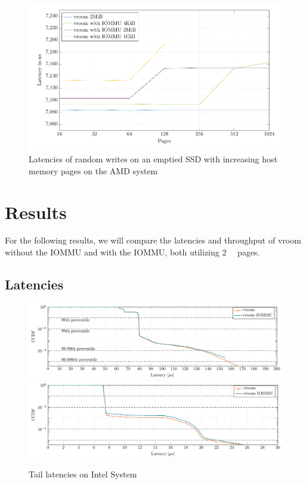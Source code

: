\begin{figure}[H]
  \centering
  \includegraphics[width=\textwidth]{figures/psmedsepyc}
  \caption{Latencies of random writes on an emptied SSD with increasing host memory pages on the AMD system}
  \label{fig:med-psepyc}
\end{figure}

\section{Results}
For the following results, we will compare the latencies and throughput of vroom without the IOMMU and with the IOMMU, both utilizing \qty{2}{\mebi\byte} pages.

\subsection{Latencies}
\begin{figure}[H]
  \centering
   {\includegraphics[width=.99\textwidth]{figures/lats_ccdf_2MiB_qd1t1_read} \label{fig:ccdf-read}}
   {\includegraphics[width=.99\textwidth]{figures/lats_ccdf_2MiB_qd1t1} \label{fig:ccdf-write}}
  \caption{Tail latencies on Intel System}
  \label{fig:ccdf}
\end{figure}

